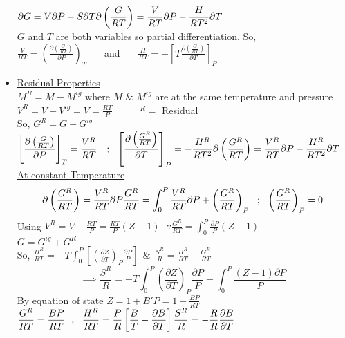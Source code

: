 \documentclass[12pt]{article}
\begin{document}
\begin{itemize}
	$\displaystyle \partial G=V\partial P-S\partial T\\
	\partial\left(\frac{G}{RT}\right)=\frac{V}{RT}\partial P- \frac{H}{RT^2}\partial T$\\ 
	$G$ and $T$ are both variables so partial differentiation.
	So,\\
	$\displaystyle \frac{V}{RT}=\left(\frac{\partial\left(\frac{G}{RT}\right)}{\partial P}\right)_T$ \ \ \ and \ \ \ $\displaystyle \frac{H}{RT}=-\left[T\frac{\partial\left(\frac{G}{RT}\right)}{\partial T}\right]_P$
	\item \underline{Residual Properties}\\
	$M^R=M-M^{ig}$ where $M$ \& $M^{ig}$ are at the same temperature and pressure\\
	$V^R=V-V^{ig} = \displaystyle V=\frac{RT}{P}$ \ \ \ \ \ $^R=$ Residual\\
	So, $G^R=G-G^{ig}$\\
	$\displaystyle\left[\frac{\partial\left(\frac{G}{RT}\right)}{\partial P}\right]_T=\frac{V^R}{RT}\ \ \ ; \ \ \left[\frac{\partial\left(\frac{G^R}{RT}\right)}{\partial T}\right]_P=-\frac{H^R}{RT^2}\\
	\partial\left(\frac{G^R}{RT}\right)=\frac{V^R}{RT}\partial P-\frac{H^R}{RT^2}\partial T$\\
	\underline{At constant Temperature}\\
	\[ \partial\left(\frac{G^R}{RT}\right)=\frac{V^R}{RT}\partial P\\
	\frac{G^R}{RT}=\int^P_0\frac{V^R}{RT}\partial P +\left(\frac{G^R}{RT}\right)_P\ \ ; \ \ \left(\frac{G^R}{RT}\right)_P=0\\\]
	Using $\displaystyle  V^R=V-\frac{RT}{P}=\frac{RT}{P}(Z-1)\ \ \ \because \frac{G^R}{RT}=\int_0^P\frac{\partial P}{P}(Z-1)$\\
	$G=G^{ig}+G^R$\\
	So, $\displaystyle \frac{H^R}{RT}=-T\int_0^P\left[\left(\frac{\partial Z}{\partial T}\right)_P\frac{\partial P}{P}\right]\ \ \&\ \ \frac{S^R}{R}=\frac{H^R}{RT}-\frac{G^R}{RT}$\\
	\[\implies\displaystyle \frac{S^R}{R}=-T\int_0^P\left(\frac{\partial Z}{\partial T}\right)_P\frac{\partial P}{P}-\int^P_0\frac{(Z-1)\partial P}{P}\]
	By equation of state $\displaystyle Z=1+B'P=1+\frac{BP}{RT}$\\
	$\displaystyle \frac{G^R}{RT}=\frac{BP}{RT} \ \ , \ \ \frac{H^R}{RT}=\frac{P}{R}\left[\frac{B}{T}-\frac{\partial B}{\partial T}\right]\\
	\frac{S^R}{R}=-\frac{R}{R}\frac{\partial B}{\partial T}$\\\\

\end{itemize}
\end{document}
